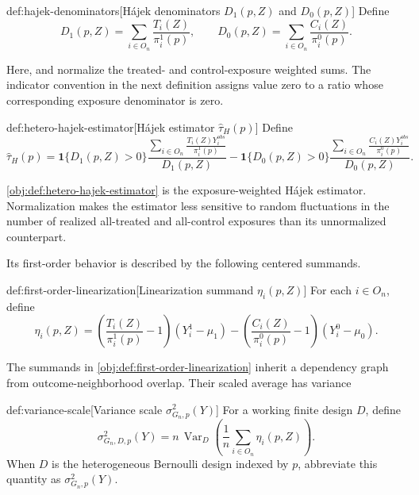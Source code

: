 \documentclass[11pt]{article}
\begin{document}
\begin{definitionv}{def:hajek-denominators}[Hájek denominators $D_1(p,Z)$ and $D_0(p,Z)$]
Define
\[
D_1(p,Z)=\sum_{i\in O_n}\frac{T_i(Z)}{\pi_i^1(p)},
\qquad
D_0(p,Z)=\sum_{i\in O_n}\frac{C_i(Z)}{\pi_i^0(p)}.
\]
\end{definitionv}

Here,  and  normalize the treated- and control-exposure weighted sums. The indicator convention in the next definition assigns value zero to a ratio whose corresponding exposure denominator is zero.

\begin{definitionv}{def:hetero-hajek-estimator}[Hájek estimator $\widehat\tau_H(p)$]
Define
\[
\widehat\tau_H(p)
=
\mathbf 1\{D_1(p,Z)>0\}
\frac{\displaystyle\sum_{i\in O_n}\frac{T_i(Z)Y_i^{obs}}{\pi_i^1(p)}}{D_1(p,Z)}
-
\mathbf 1\{D_0(p,Z)>0\}
\frac{\displaystyle\sum_{i\in O_n}\frac{C_i(Z)Y_i^{obs}}{\pi_i^0(p)}}{D_0(p,Z)}.
\]
\end{definitionv}

\cref{obj:def:hetero-hajek-estimator} is the exposure-weighted Hájek estimator. Normalization makes the estimator less sensitive to random fluctuations in the number of realized all-treated and all-control exposures than its unnormalized counterpart.

Its first-order behavior is described by the following centered summands.

\begin{definitionv}{def:first-order-linearization}[Linearization summand $\eta_i(p,Z)$]
For each \(i\in O_n\), define
\[
\eta_i(p,Z)
=
\left(\frac{T_i(Z)}{\pi_i^1(p)}-1\right)(Y_i^1-\mu_1)
-
\left(\frac{C_i(Z)}{\pi_i^0(p)}-1\right)(Y_i^0-\mu_0).
\]
\end{definitionv}

The summands in \cref{obj:def:first-order-linearization} inherit a dependency graph from outcome-neighborhood overlap. Their scaled average has variance

\begin{definitionv}{def:variance-scale}[Variance scale $\sigma^2_{G_n,p}(Y)$]
For a working finite design $D$, define
\[
\sigma^2_{G_n,D,p}(Y)
=
n\,\operatorname{Var}_D\!\left(
\frac{1}{n}\sum_{i\in O_n}\eta_i(p,Z)
\right).
\]
When $D$ is the heterogeneous Bernoulli design indexed by $p$, abbreviate this quantity as $\sigma^2_{G_n,p}(Y)$.
\end{definitionv}
\end{document}
